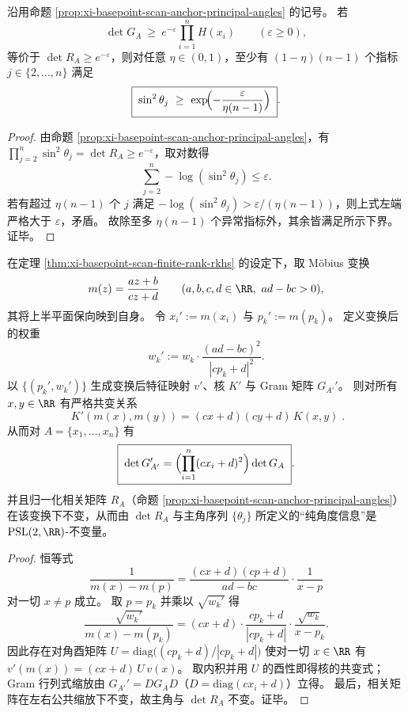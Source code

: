 \begin{corollary}\label{cor:xi-basepoint-scan-anchor-angle-concentration}
沿用命题 \ref{prop:xi-basepoint-scan-anchor-principal-angles} 的记号。
若
\[
\det G_A\ \ge\ e^{-\varepsilon}\prod_{i=1}^{n}H(x_i)\qquad(\varepsilon\ge 0),
\]
等价于 \(\det R_A\ge e^{-\varepsilon}\)，则对任意 \(\eta\in(0,1)\)，至少有 \((1-\eta)(n-1)\) 个指标 \(j\in\{2,\dots,n\}\) 满足
\[
\boxed{\;
\sin^2\theta_j\ \ge\ \exp\!\Bigl(-\frac{\varepsilon}{\eta(n-1)}\Bigr)\; }.
\]
\end{corollary}
\begin{proof}
由命题 \ref{prop:xi-basepoint-scan-anchor-principal-angles}，有 \(\prod_{j=2}^{n}\sin^2\theta_j=\det R_A\ge e^{-\varepsilon}\)，取对数得
\[
\sum_{j=2}^{n}-\log(\sin^2\theta_j)\le \varepsilon.
\]
若有超过 \(\eta(n-1)\) 个 \(j\) 满足 \(-\log(\sin^2\theta_j)>\varepsilon/(\eta(n-1))\)，则上式左端严格大于 \(\varepsilon\)，矛盾。
故除至多 \(\eta(n-1)\) 个异常指标外，其余皆满足所示下界。证毕。
\end{proof}

\begin{proposition}\label{prop:xi-basepoint-scan-psl2r-covariance}
在定理 \ref{thm:xi-basepoint-scan-finite-rank-rkhs} 的设定下，取 Möbius 变换
\[
m(z)=\frac{az+b}{cz+d}\qquad(a,b,c,d\in\RR,\ ad-bc>0),
\]
其将上半平面保向映到自身。
令 \(x_i':=m(x_i)\) 与 \(p_k':=m(p_k)\)。
定义变换后的权重
\[
w_k':=w_k\cdot\frac{(ad-bc)^2}{|cp_k+d|^2}.
\]
以 \(\{(p_k',w_k')\}\) 生成变换后特征映射 \(v'\)、核 \(K'\) 与 Gram 矩阵 \(G_{A'}'\)。
则对所有 \(x,y\in\RR\) 有严格共变关系
\[
\boxed{\;
K'(m(x),m(y))=(cx+d)(cy+d)\,K(x,y)\; }.
\]
从而对 \(A=\{x_1,\dots,x_n\}\) 有
\[
\boxed{\;
\det G_{A'}'=\Bigl(\prod_{i=1}^{n}(cx_i+d)^2\Bigr)\det G_A\; }.
\]
并且归一化相关矩阵 \(R_A\)（命题 \ref{prop:xi-basepoint-scan-anchor-principal-angles}）在该变换下不变，从而由 \(\det R_A\) 与主角序列 \(\{\theta_j\}\) 所定义的“纯角度信息”是 \(\mathrm{PSL}(2,\RR)\)-不变量。
\end{proposition}
\begin{proof}
恒等式
\[
\frac{1}{m(x)-m(p)}=\frac{(cx+d)(cp+d)}{ad-bc}\cdot\frac{1}{x-p}
\]
对一切 \(x\neq p\) 成立。
取 \(p=p_k\) 并乘以 \(\sqrt{w_k'}\) 得
\[
\frac{\sqrt{w_k'}}{m(x)-m(p_k)}
=(cx+d)\cdot \frac{cp_k+d}{|cp_k+d|}\cdot \frac{\sqrt{w_k}}{x-p_k}.
\]
因此存在对角酉矩阵 \(U=\mathrm{diag}\bigl((cp_k+d)/|cp_k+d|\bigr)\) 使对一切 \(x\in\RR\) 有
\(
v'(m(x))=(cx+d)\,U\,v(x)
\)。
取内积并用 \(U\) 的酉性即得核的共变式；Gram 行列式缩放由 \(G_{A'}'=D G_A D\)（\(D=\mathrm{diag}(cx_i+d)\)）立得。
最后，相关矩阵在左右公共缩放下不变，故主角与 \(\det R_A\) 不变。证毕。
\end{proof}

